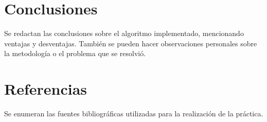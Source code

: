 \documentclass[11pt]{article}
\begin{document}
\section*{Conclusiones}

Se redactan las conclusiones sobre el algoritmo implementado, mencionando ventajas y desventajas. También se pueden hacer observaciones personales sobre la metodología o el problema que se resolvió.

\section*{Referencias}
Se enumeran las fuentes bibliográficas utilizadas para la realización de la práctica.
\end{document}
